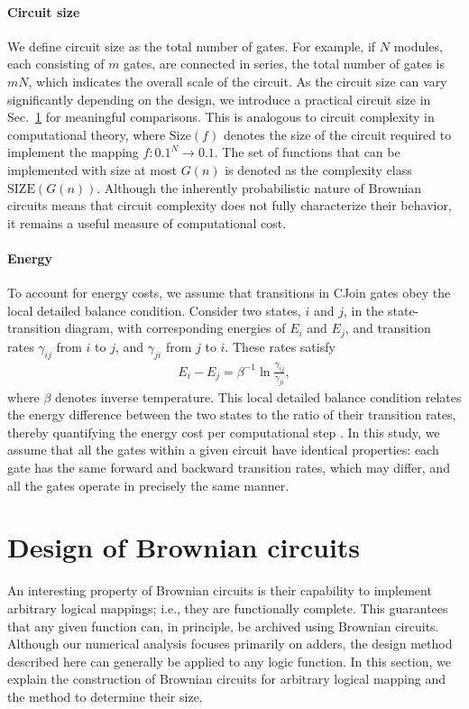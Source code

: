 \documentclass[%
 reprint,
superscriptaddress,
 amsmath,amssymb,
 aps,
 prx,
]{revtex4-2}
\begin{document}
\paragraph{Circuit size}
We define circuit size as the total number of gates. For example, if $N$ modules, each consisting of $m$ gates, are connected in series, the total number of gates is $mN$, which indicates the overall scale of the circuit. 
As the circuit size can vary significantly depending on the design, we introduce a practical circuit size in Sec.~\ref{sec:design_BC} for meaningful comparisons. This is analogous to circuit complexity in computational theory\cite{Shannon_complexity-switching-circuit}, where $\text{Size}(f)$ denotes the size of the circuit required to implement the mapping $f:\qty{0,1}^N \to \qty{0,1}$. The set of functions that can be implemented with size at most $G(n)$ is denoted as the complexity class $\text{SIZE}(G(n))$. 
Although the inherently probabilistic nature of Brownian circuits means that circuit complexity does not fully characterize their behavior, it remains a useful measure of computational cost.

\paragraph{Energy}
To account for energy costs, we assume that transitions in CJoin gates obey the local detailed balance condition. Consider two states, $i$ and $j$, in the state-transition diagram, with corresponding energies of $E_i$ and $E_j$, and  transition rates $\gamma_{ij}$ from $i$ to $j$, and $\gamma_{ji}$ from $j$ to $i$. These rates satisfy   
\begin{align}
    E_i - E_j = \beta^{-1} \ln \frac{\gamma_{ij}}{\gamma_{ji}},
    \label{eqn:egamma}
\end{align}
where $\beta$ denotes inverse temperature. 
This local detailed balance condition relates the energy difference between the two states to the ratio of their transition rates, thereby quantifying the energy cost per computational step \cite{bennett_thermodynamics_1982}.
In this study, we assume that all the gates within a given circuit have identical properties: each gate has the same forward and backward transition rates, which may differ, and all the gates operate in precisely the same manner.

\section{Design of Brownian circuits}\label{sec:design_BC}
An interesting property of Brownian circuits is their capability to implement arbitrary logical mappings; i.e., they are functionally complete\cite{peper_brownian_2013,lee_brownian_2016}. 
This guarantees that any given function can, in principle, be archived using Brownian circuits. Although our numerical analysis focuses primarily on adders, the design method described here can generally be applied to any logic function. In this section, we explain the construction of Brownian circuits for arbitrary logical mapping and the method to determine their size.
\end{document}
